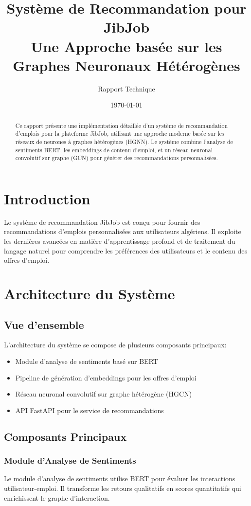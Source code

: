 \documentclass[12pt,a4paper]{article}
\title{Système de Recommandation pour JibJob\\
\large Une Approche basée sur les Graphes Neuronaux Hétérogènes}
\author{Rapport Technique}
\date{\today}
\begin{document}
\maketitle

\begin{abstract}
Ce rapport présente une implémentation détaillée d'un système de recommandation d'emplois pour la plateforme JibJob, utilisant une approche moderne basée sur les réseaux de neurones à graphes hétérogènes (HGNN). Le système combine l'analyse de sentiments BERT, les embeddings de contenu d'emploi, et un réseau neuronal convolutif sur graphe (GCN) pour générer des recommandations personnalisées.
\end{abstract}

\tableofcontents

\section{Introduction}
Le système de recommandation JibJob est conçu pour fournir des recommandations d'emplois personnalisées aux utilisateurs algériens. Il exploite les dernières avancées en matière d'apprentissage profond et de traitement du langage naturel pour comprendre les préférences des utilisateurs et le contenu des offres d'emploi.

\section{Architecture du Système}
\subsection{Vue d'ensemble}
L'architecture du système se compose de plusieurs composants principaux:
\begin{itemize}
    \item Module d'analyse de sentiments basé sur BERT
    \item Pipeline de génération d'embeddings pour les offres d'emploi
    \item Réseau neuronal convolutif sur graphe hétérogène (HGCN)
    \item API FastAPI pour le service de recommandations
\end{itemize}

\subsection{Composants Principaux}
\subsubsection{Module d'Analyse de Sentiments}
Le module d'analyse de sentiments utilise BERT pour évaluer les interactions utilisateur-emploi. Il transforme les retours qualitatifs en scores quantitatifs qui enrichissent le graphe d'interaction.
\end{document}
